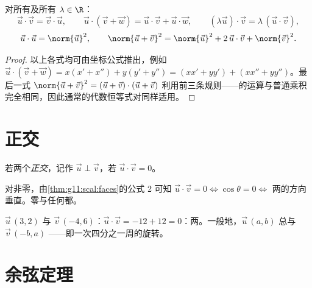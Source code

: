 \begin{proposition}[代数运算规则]\label{prop:g11:scal:rules}
对所有及所有 $\lambda \in \R$：
\[
\vec u \cdot \vec v = \vec v \cdot \vec u, \qquad
\vec u \cdot (\vec v + \vec w) = \vec u \cdot \vec v + \vec u \cdot
\vec w, \qquad
(\lambda \vec u)\cdot \vec v = \lambda\,(\vec u \cdot \vec v),
\]
\[
\vec u \cdot \vec u = \norm{\vec u}^2,
\qquad
\norm{\vec u + \vec v}^2 = \norm{\vec u}^2 + 2\,\vec u\cdot\vec v +
\norm{\vec v}^2 .
\]
\end{proposition}

\begin{proof}
以上各式均可由坐标公式推出，例如
$\vec u \cdot (\vec v + \vec w) = x(x' + x'') + y(y' + y'') =
(xx' + yy') + (xx'' + yy'')$。最后一式
$\norm{\vec u + \vec v}^2 = (\vec u + \vec v)\cdot(\vec u + \vec v)$
利用前三条规则——的运算与普通乘积
完全相同，因此通常的代数恒等式对同样适用。
\end{proof}

\section{正交}

\begin{definition}[正交向量]\label{def:g11:scal:orthogonal}
若两个\emph{正交}，记作
$\vec u \perp \vec v$，若 $\vec u \cdot \vec v = 0$。
\end{definition}

\begin{remark}
对非零，由\cref{thm:g11:scal:faces}的公式 2
可知 $\vec u \cdot \vec v = 0 \iff \cos\theta = 0 \iff$ 两的方向
垂直。零与任何都。
\end{remark}

\begin{example}
$\vec u\,(3, 2)$ 与 $\vec v\,(-4, 6)$：$\vec u \cdot \vec v = -12 + 12 =
0$：两。一般地，$\vec u\,(a, b)$ 总与
$\vec v\,(-b, a)$ ——即一次四分之一周的旋转。
\end{example}

\section{余弦定理}

